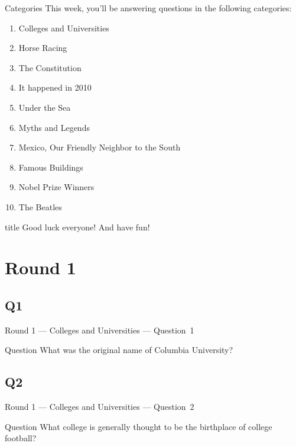 \documentclass[11pt]{beamer}
\begin{document}
\begingroup{}
\begin{frame}[t]{Categories}
This week, you'll be answering questions in the following categories:
\begin{enumerate}
\item Colleges and Universities
\item Horse Racing
\item The Constitution
\item It happened in 2010
\item Under the Sea
\item Myths and Legends
\item Mexico, Our Friendly Neighbor to the South
\item Famous Buildings
\item Nobel Prize Winners
\item The Beatles
\end{enumerate}
\end{frame}
\endgroup{}

\begingroup{}
\begin{frame}
\vfill{}
\begin{beamercolorbox}[sep=8pt,center,shadow=true,rounded=true]{title}
Good luck everyone! And have fun!
\end{beamercolorbox}
\vfill{}
\end{frame}
\endgroup{}
\def\thisSectionName{Colleges and Universities}
\section{Round 1}
\subsection*{Q1}
\begin{frame}[t]{Round 1 --- Colleges and Universities --- \mbox{Question 1}}
\vspace{-0.5em}
\begin{block}{Question}
What was the original name of Columbia University?
\end{block}
\end{frame}
\subsection*{Q2}
\begin{frame}[t]{Round 1 --- Colleges and Universities --- \mbox{Question 2}}
\vspace{-0.5em}
\begin{block}{Question}
What college is generally  thought to be the birthplace of college football? 
\end{block}
\end{frame}
\end{document}
